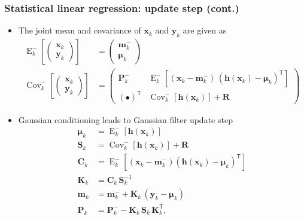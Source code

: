 \documentclass[first=dgreen,second=purple,presentation]{elecslides}
\newcommand{\mbf}[1]{\mathbf{#1}}
\newcommand{\mathbold}[1]{\bm{#1}}
\newcommand{\T}[0]{\mathsf{T}}
\DeclareMathOperator{\Cov}{Cov}
\DeclareMathOperator{\E}{E}
\newcommand{\vmu}[0]{\mathbold{\mu}}
\newcommand{\vh}{\mbf{h}}
\newcommand{\vm}{\mbf{m}}
\newcommand{\vx}{\mbf{x}}
\newcommand{\vy}{\mbf{y}}
\newcommand{\MC}{\mbf{C}}
\newcommand{\MK}{\mbf{K}}
\newcommand{\MP}{\mbf{P}}
\newcommand{\MR}{\mbf{R}}
\newcommand{\MS}{\mbf{S}}
\begin{document}
\begin{frame}
 \frametitle{Statistical linear regression: update step (cont.)}

\begin{itemize}[<+->]
\item The \alert{joint mean and covariance} of $\vx_k$ and $\vy_k$ are given as
%
\begin{equation}
\begin{split}
  \E_k^-\left[ \begin{pmatrix} \vx_k \\ \vy_k \end{pmatrix} \right]
  &= \begin{pmatrix} \vm_k^- \\ \vmu_k \end{pmatrix} \\
  \Cov_k^-\left[ \begin{pmatrix} \vx_k \\ \vy_k \end{pmatrix} \right]
  &= \begin{pmatrix}
     \MP_k^-  & \E_k^-\left[ (\vx_{k} - \vm_{k}^-) \, (\vh(\vx_{k}) - \vmu_k)^\T \right] \\
      (\bullet)^\T & \Cov_k^-[ \vh(\vx_{k}) ] + \MR
      \end{pmatrix}
\end{split}
\nonumber
\end{equation}

\item \alert{Gaussian conditioning} leads to Gaussian filter update step
%
{\small
\begin{equation}
\begin{split}
  \vmu_k &= \E_k^-[ \vh(\vx_{k}) ] \\
   \MS_k &= \Cov_k^-[ \vh(\vx_{k}) ] + \MR \\
   \MC_k &= \E_k^-\left[ (\vx_{k} - \vm_{k}^-) (\vh(\vx_{k}) - \vmu_k)^\T \right] \\
   \MK_k &= \MC_k \, \MS_k^{-1} \\
   \vm_k &= \vm_k^- + \MK_k \, (\vy_k - \vmu_k) \\
   \MP_k &= \MP_k^- - \MK_k \, \MS_k \, \MK_k^\T,
\end{split}
\nonumber
\end{equation}
}
\end{itemize}
\end{frame}


\end{document}

